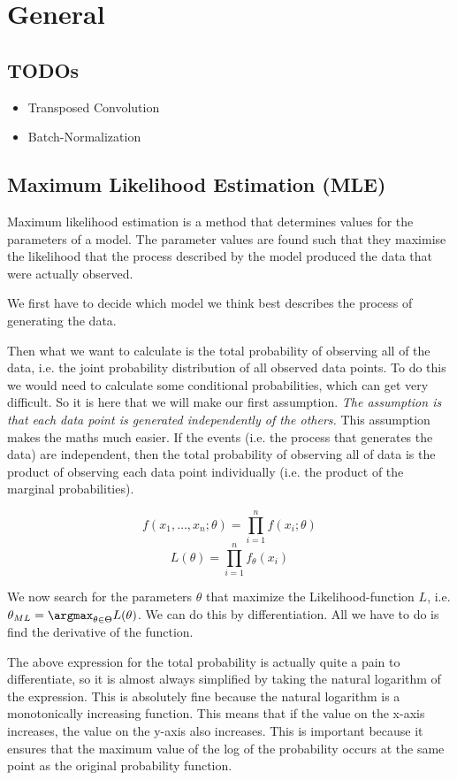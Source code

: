 \section{General}
\subsection{TODOs}
\begin{itemize}
	\item
		Transposed Convolution
	\item
		Batch-Normalization
\end{itemize}

\subsection[Maximum Likelihood Estimation (MLE)]{Maximum Likelihood Estimation (MLE)\cite{mle-wikipedia} \cite{mle-tds}}
Maximum likelihood estimation is a method that determines values for the parameters of a model. The parameter values are found such that they maximise the likelihood that the process described by the model produced the data that were actually observed.

We first have to decide which model we think best describes the process of generating the data.

Then what we want to calculate is the total probability of observing all of the data, i.e. the joint probability distribution of all observed data points. To do this we would need to calculate some conditional probabilities, which can get very difficult. So it is here that we will make our first assumption. \textit{The assumption is that each data point is generated independently of the others.} This assumption makes the maths much easier. If the events (i.e. the process that generates the data) are independent, then the total probability of observing all of data is the product of observing each data point individually (i.e. the product of the marginal probabilities).

$$f(x_1, \dots, x_n; \theta) = \prod_{i=1}^n f(x_i; \theta)$$
$$L(\theta) = \prod_{i=1}^n f_{\theta}(x_i)$$

We now search for the parameters $\theta$ that maximize the Likelihood-function $L$, i.e. $\theta_{ML} = \argmax_{\theta \in \Theta} L(\theta)$. We can do this by differentiation. All we have to do is find the derivative of the function.

The above expression for the total probability is actually quite a pain to differentiate, so it is almost always simplified by taking the natural logarithm of the expression. This is absolutely fine because the natural logarithm is a monotonically increasing function. This means that if the value on the x-axis increases, the value on the y-axis also increases. This is important because it ensures that the maximum value of the log of the probability occurs at the same point as the original probability function.

